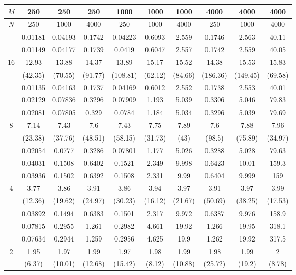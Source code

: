 \begin{table}[ht]
\centering
\begin{tabular}{c|c|c|c|c|c|c|c|c|c|}
\hline
$M$ & 250 & 250 & 250 & 1000 & 1000 & 1000 & 4000 & 4000 & 4000 \\
\hline
$N$ & 250 & 1000 & 4000 & 250 & 1000 & 4000 & 250 & 1000 & 4000 \\
\hline
 & 0.01181 & 0.04193 & 0.1742 & 0.04223 & 0.6093 & 2.559 & 0.1746 & 2.563 & 40.11 \\
 & 0.01149 & 0.04177 & 0.1739 & 0.0419 & 0.6047 & 2.557 & 0.1742 & 2.559 & 40.05 \\
16 & 12.93 & 13.88 & 14.37 & 13.89 & 15.17 & 15.52 & 14.38 & 15.53 & 15.83 \\
 & (42.35) & (70.55) & (91.77) & (108.81) & (62.12) & (84.66) & (186.36) & (149.45) & (69.58) \\
 & 0.01135 & 0.04163 & 0.1737 & 0.04169 & 0.6012 & 2.552 & 0.1738 & 2.553 & 40.01 \\
\hline
 & 0.02129 & 0.07836 & 0.3296 & 0.07909 & 1.193 & 5.039 & 0.3306 & 5.046 & 79.83 \\
 & 0.02081 & 0.07805 & 0.329 & 0.0784 & 1.184 & 5.034 & 0.3296 & 5.039 & 79.69 \\
8 & 7.14 & 7.43 & 7.6 & 7.43 & 7.75 & 7.89 & 7.6 & 7.88 & 7.96 \\
 & (23.38) & (37.76) & (48.51) & (58.15) & (31.73) & (43) & (98.5) & (75.89) & (34.97) \\
 & 0.02054 & 0.0777 & 0.3286 & 0.07801 & 1.177 & 5.026 & 0.3288 & 5.028 & 79.63 \\
\hline
 & 0.04031 & 0.1508 & 0.6402 & 0.1521 & 2.349 & 9.998 & 0.6423 & 10.01 & 159.3 \\
 & 0.03936 & 0.1502 & 0.6392 & 0.1508 & 2.331 & 9.99 & 0.6404 & 9.999 & 159 \\
4 & 3.77 & 3.86 & 3.91 & 3.86 & 3.94 & 3.97 & 3.91 & 3.97 & 3.99 \\
 & (12.36) & (19.62) & (24.97) & (30.23) & (16.12) & (21.67) & (50.69) & (38.25) & (17.53) \\
 & 0.03892 & 0.1494 & 0.6383 & 0.1501 & 2.317 & 9.972 & 0.6387 & 9.976 & 158.9 \\
\hline
 & 0.07815 & 0.2955 & 1.261 & 0.2982 & 4.661 & 19.92 & 1.266 & 19.95 & 318.1 \\
 & 0.07634 & 0.2944 & 1.259 & 0.2956 & 4.625 & 19.9 & 1.262 & 19.92 & 317.5 \\
2 & 1.95 & 1.97 & 1.99 & 1.97 & 1.98 & 1.99 & 1.98 & 1.99 & 2 \\
 & (6.37) & (10.01) & (12.68) & (15.42) & (8.12) & (10.88) & (25.72) & (19.2) & (8.78) \\

\end{tabular}
\end{table}
